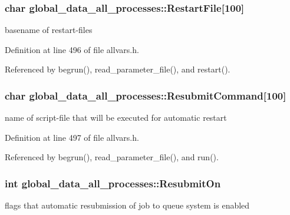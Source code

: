 \hypertarget{structglobal__data__all__processes_a67e197a37469217aa8ad32c42230b286}{
\subsubsection[{RestartFile}]{\setlength{\rightskip}{0pt plus 5cm}char {\bf global\_\-data\_\-all\_\-processes::RestartFile}\mbox{[}100\mbox{]}}}
\label{structglobal__data__all__processes_a67e197a37469217aa8ad32c42230b286}
basename of restart-\/files 

Definition at line 496 of file allvars.h.



Referenced by begrun(), read\_\-parameter\_\-file(), and restart().

\hypertarget{structglobal__data__all__processes_a59f86964a3a1b03933a787cfc280951a}{
\subsubsection[{ResubmitCommand}]{\setlength{\rightskip}{0pt plus 5cm}char {\bf global\_\-data\_\-all\_\-processes::ResubmitCommand}\mbox{[}100\mbox{]}}}
\label{structglobal__data__all__processes_a59f86964a3a1b03933a787cfc280951a}
name of script-\/file that will be executed for automatic restart 

Definition at line 497 of file allvars.h.



Referenced by begrun(), read\_\-parameter\_\-file(), and run().

\hypertarget{structglobal__data__all__processes_a6578ce0ee08f770891c662c0ab4ad10c}{
\subsubsection[{ResubmitOn}]{\setlength{\rightskip}{0pt plus 5cm}int {\bf global\_\-data\_\-all\_\-processes::ResubmitOn}}}
\label{structglobal__data__all__processes_a6578ce0ee08f770891c662c0ab4ad10c}
flags that automatic resubmission of job to queue system is enabled 

